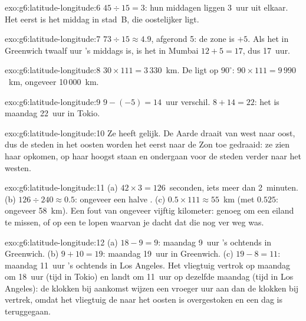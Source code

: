 \begin{solution}{exo:g6:latitude-longitude:6}
$45 \div 15 = 3$: hun middagen liggen 3~uur uit elkaar. Het eerst is het
middag in stad~B, die oostelijker ligt.
\end{solution}

\begin{solution}{exo:g6:latitude-longitude:7}
$73 \div 15 \approx 4.9$, afgerond 5: de zone is $+5$. Als het in
Greenwich twaalf uur 's middags is, is het in Mumbai $12 + 5 = 17$, dus
17~uur.
\end{solution}

\begin{solution}{exo:g6:latitude-longitude:8}
$30 \times 111 = 3\,330$~km. De  ligt op $90^\circ$:
$90 \times 111 = 9\,990$~km, ongeveer 10\,000~km.
\end{solution}

\begin{solution}{exo:g6:latitude-longitude:9}
$9 - (-5) = 14$~uur verschil. $8 + 14 = 22$: het is maandag 22~uur in
Tokio.
\end{solution}

\begin{solution}{exo:g6:latitude-longitude:10}
Ze heeft gelijk. De Aarde draait van west naar oost, dus de steden in het
oosten worden het eerst naar de Zon toe gedraaid: ze zien haar opkomen, op
haar hoogst staan en ondergaan voor de steden verder naar het westen.
\end{solution}

\begin{solution}{exo:g6:latitude-longitude:11}
(a) $42 \times 3 = 126$~seconden, iets meer dan 2~minuten. (b)
$126 \div 240 \approx 0.5$: ongeveer een halve . (c)
$0.5 \times 111 \approx 55$~km (met $0.525$: ongeveer 58~km). Een fout van
ongeveer vijftig kilometer: genoeg om een eiland te missen, of op een 
te lopen waarvan je dacht dat die nog ver weg was.
\end{solution}

\begin{solution}{exo:g6:latitude-longitude:12}
(a) $18 - 9 = 9$: maandag 9~uur 's ochtends in Greenwich. (b)
$9 + 10 = 19$: maandag 19~uur in Greenwich. (c) $19 - 8 = 11$: maandag
11~uur 's ochtends in Los Angeles. Het vliegtuig vertrok op maandag om
18~uur (tijd in Tokio) en landt om 11~uur op dezelfde maandag (tijd in Los
Angeles): de klokken bij aankomst wijzen een vroeger uur aan dan de
klokken bij vertrek, omdat het vliegtuig de  naar het oosten is
overgestoken en een dag is teruggegaan.
\end{solution}

